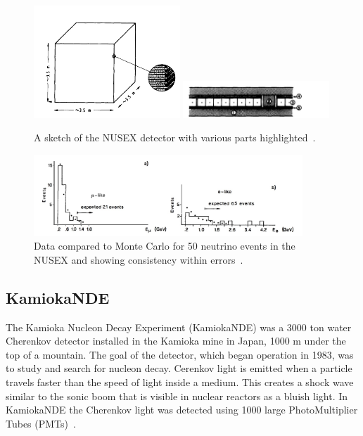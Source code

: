 \begin{figure}[h!]
\centering
  \centering
\includegraphics[width=0.49\textwidth]{figures/nusex1.jpeg}
\includegraphics[width=0.49\textwidth]{figures/nusex2.jpeg}
\vspace{2mm}
\caption{A sketch of the NUSEX detector with various parts highlighted~\cite{56NUSEX}.}
\label{fig:nusex}
\end{figure}

\begin{figure}[h!]
\centering
  \centering
\includegraphics[width=0.9\textwidth]{figures/nusexres.jpeg}
\vspace{2mm}
\caption{Data compared to Monte Carlo for 50 neutrino events in the NUSEX and showing consistency within errors~\cite{57NUSEX}.}
\label{fig:nusexres}
\end{figure}

\subsection{KamiokaNDE}
The Kamioka Nucleon Decay Experiment (KamiokaNDE) was a 3000 ton water Cherenkov detector installed in the Kamioka mine in Japan, 1000 m under the top of a mountain. The goal of the detector, which began operation in 1983, was to study and search for nucleon decay. Cerenkov light is emitted when a particle travels faster than the speed of light inside a medium. This creates a shock wave similar to the sonic boom that is visible in nuclear reactors as a bluish light. In KamiokaNDE the Cherenkov light was detected using 1000 large PhotoMultiplier Tubes (PMTs)~\cite{58KAMIOKA}.


